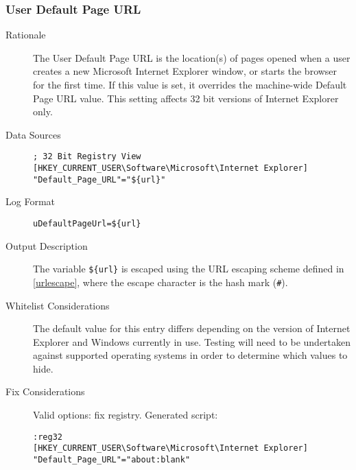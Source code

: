 \documentclass[letterpaper,12pt]{article}
\newcommand{\var}[1]{\texttt{\$\{#1\}}}
\begin{document}
\subsubsection{User Default Page URL}
\begin{description}
\item[Rationale] The User Default Page URL is the location(s) of pages
opened when a user creates a new Microsoft Internet Explorer window, or starts
the browser for the first time. If this value is set, it overrides the
machine-wide Default Page URL value. This setting affects 32 bit versions of
Internet Explorer only.
\item[Data Sources] \hfill
\vspace{-\baselineskip}
\begin{verbatim}
; 32 Bit Registry View
[HKEY_CURRENT_USER\Software\Microsoft\Internet Explorer]
"Default_Page_URL"="${url}"
\end{verbatim}
\item[Log Format] \hfill
\vspace{-\baselineskip}
\begin{verbatim} 
uDefaultPageUrl=${url}
\end{verbatim}
\item[Output Description] The variable \var{url} is escaped using the
URL escaping scheme defined in \ref{urlescape}, where the escape character is the
hash mark (\verb|#|). 
\item[Whitelist Considerations] The default value for this entry
differs depending on the version of Internet Explorer and Windows currently in
use. Testing will need to be undertaken against supported operating systems in
order to determine which values to hide.
\item[Fix Considerations] Valid options: fix registry. Generated script:
\vspace{-\baselineskip}
\begin{verbatim}
:reg32
[HKEY_CURRENT_USER\Software\Microsoft\Internet Explorer]
"Default_Page_URL"="about:blank"
\end{verbatim}
\end{description}
\end{document}
